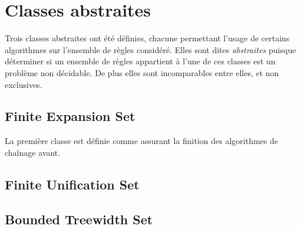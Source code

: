 
\section{Classes abstraites}\label{classes_abstraites}
Trois classes abstraites ont été définies, chacune permettant l'usage de certains
algorithmes sur l'ensemble de règles considéré.
Elles sont dites {\em abstraites} puisque déterminer si un ensemble de règles appartient
à l'une de ces classes est un problème non décidable.
De plus elles sont incomparables entre elles, et non exclusives. 

\subsection{Finite Expansion Set}\label{classes_abstraites_fus}
La première classe est définie comme assurant la finition des algorithmes de chaînage
avant.

\subsection{Finite Unification Set}\label{classes_abstraites_fes}

\subsection{Bounded Treewidth Set}\label{classes_abstraites_bts}

